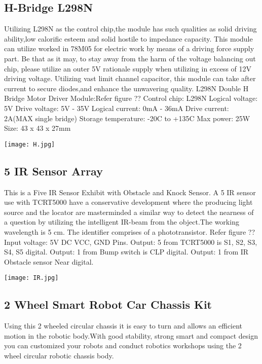 \documentclass[12pt]{article}
\begin{document}
\subsection{H-Bridge L298N}
Utilizing L298N as the control chip,the module has such qualities as solid
driving ability,low calorific esteem and solid hostile to impedance capacity.
This module can utilize worked in 78M05 for electric work by means of a
driving force supply part. Be that as it may, to stay away from the harm of
the voltage balancing out chip, please utilize an outer 5V rationale supply
when utilizing in excess of 12V driving voltage. Utilizing vast limit channel
capacitor, this module can take after current to secure diodes,and enhance
the unwavering quality. L298N Double H Bridge Motor Driver Module:Refer
figure ?? Control chip: L298N
Logical voltage: 5V
Drive voltage: 5V - 35V
Logical current: 0mA - 36mA
Drive current: 2A(MAX single bridge)
Storage temperature: -20C to +135C
Max power: 25W
Size: 43 x 43 x 27mm
\begin{center}
\bigbreak
\texttt{[image: H.jpg]}\\
\bigbreak
\end{center}

\subsection{5 IR Sensor Array}
This is a Five IR Sensor Exhibit with Obstacle and Knock Sensor. A 5
IR sensor use with TCRT5000 have a conservative development where the
producing light source and the locator are masterminded a similar way to
detect the nearness of a question by utilizing the intelligent IR-beam from
the object.The working wavelength is 5 cm. The identifier comprises of a
phototransistor. Refer figure ?? Input voltage: 5V DC VCC, GND Pins.
Output: 5 from TCRT5000 is S1, S2, S3, S4, S5 digital.
Output: 1 from Bump switch is CLP digital.
Output: 1 from IR Obstacle sensor Near digital.
\begin{center}
\bigbreak
\texttt{[image: IR.jpg]}\\
\bigbreak
\end{center}

\subsection{2 Wheel Smart Robot Car Chassis Kit}
Using this 2 wheeled circular chassis it is easy to turn and allows an efficient motion in the robotic
body.With good stability, strong smart and compact design you can customized your robots and conduct
robotics workshops using the 2 wheel circular robotic chassis body.
\end{document}
